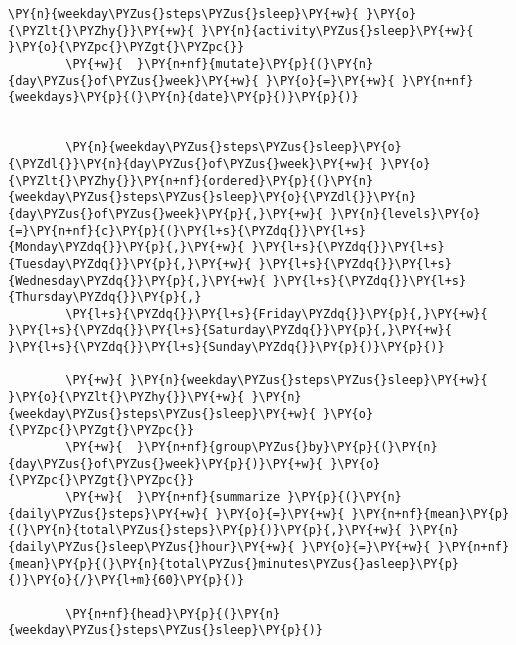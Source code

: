 \begin{tcolorbox}[breakable, size=fbox, boxrule=1pt, pad at break*=1mm,colback=cellbackground, colframe=cellborder]
    \begin{Verbatim}[commandchars=\\\{\}]
        \PY{n}{weekday\PYZus{}steps\PYZus{}sleep}\PY{+w}{ }\PY{o}{\PYZlt{}\PYZhy{}}\PY{+w}{ }\PY{n}{activity\PYZus{}sleep}\PY{+w}{ }\PY{o}{\PYZpc{}\PYZgt{}\PYZpc{}}
        \PY{+w}{  }\PY{n+nf}{mutate}\PY{p}{(}\PY{n}{day\PYZus{}of\PYZus{}week}\PY{+w}{ }\PY{o}{=}\PY{+w}{ }\PY{n+nf}{weekdays}\PY{p}{(}\PY{n}{date}\PY{p}{)}\PY{p}{)}


        \PY{n}{weekday\PYZus{}steps\PYZus{}sleep}\PY{o}{\PYZdl{}}\PY{n}{day\PYZus{}of\PYZus{}week}\PY{+w}{ }\PY{o}{\PYZlt{}\PYZhy{}}\PY{n+nf}{ordered}\PY{p}{(}\PY{n}{weekday\PYZus{}steps\PYZus{}sleep}\PY{o}{\PYZdl{}}\PY{n}{day\PYZus{}of\PYZus{}week}\PY{p}{,}\PY{+w}{ }\PY{n}{levels}\PY{o}{=}\PY{n+nf}{c}\PY{p}{(}\PY{l+s}{\PYZdq{}}\PY{l+s}{Monday\PYZdq{}}\PY{p}{,}\PY{+w}{ }\PY{l+s}{\PYZdq{}}\PY{l+s}{Tuesday\PYZdq{}}\PY{p}{,}\PY{+w}{ }\PY{l+s}{\PYZdq{}}\PY{l+s}{Wednesday\PYZdq{}}\PY{p}{,}\PY{+w}{ }\PY{l+s}{\PYZdq{}}\PY{l+s}{Thursday\PYZdq{}}\PY{p}{,}
        \PY{l+s}{\PYZdq{}}\PY{l+s}{Friday\PYZdq{}}\PY{p}{,}\PY{+w}{ }\PY{l+s}{\PYZdq{}}\PY{l+s}{Saturday\PYZdq{}}\PY{p}{,}\PY{+w}{ }\PY{l+s}{\PYZdq{}}\PY{l+s}{Sunday\PYZdq{}}\PY{p}{)}\PY{p}{)}

        \PY{+w}{ }\PY{n}{weekday\PYZus{}steps\PYZus{}sleep}\PY{+w}{ }\PY{o}{\PYZlt{}\PYZhy{}}\PY{+w}{ }\PY{n}{weekday\PYZus{}steps\PYZus{}sleep}\PY{+w}{ }\PY{o}{\PYZpc{}\PYZgt{}\PYZpc{}}
        \PY{+w}{  }\PY{n+nf}{group\PYZus{}by}\PY{p}{(}\PY{n}{day\PYZus{}of\PYZus{}week}\PY{p}{)}\PY{+w}{ }\PY{o}{\PYZpc{}\PYZgt{}\PYZpc{}}
        \PY{+w}{  }\PY{n+nf}{summarize }\PY{p}{(}\PY{n}{daily\PYZus{}steps}\PY{+w}{ }\PY{o}{=}\PY{+w}{ }\PY{n+nf}{mean}\PY{p}{(}\PY{n}{total\PYZus{}steps}\PY{p}{)}\PY{p}{,}\PY{+w}{ }\PY{n}{daily\PYZus{}sleep\PYZus{}hour}\PY{+w}{ }\PY{o}{=}\PY{+w}{ }\PY{n+nf}{mean}\PY{p}{(}\PY{n}{total\PYZus{}minutes\PYZus{}asleep}\PY{p}{)}\PY{o}{/}\PY{l+m}{60}\PY{p}{)}

        \PY{n+nf}{head}\PY{p}{(}\PY{n}{weekday\PYZus{}steps\PYZus{}sleep}\PY{p}{)}


\end{Verbatim}
\end{tcolorbox}
